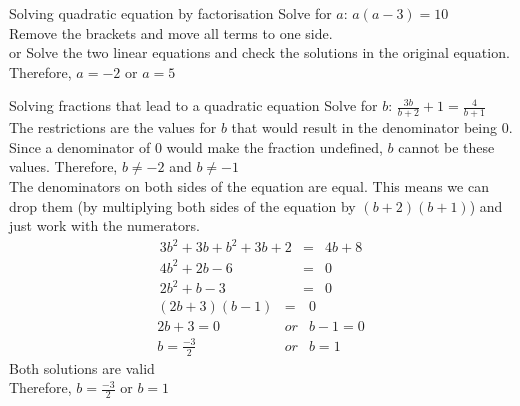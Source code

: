 \begin{wex}{Solving quadratic equation by factorisation}
{Solve for $a$: $a(a-3)=10$\\}{
Remove the brackets and move all terms to one side.\\
or
Solve the two linear equations and check the solutions in the original equation.\\
Therefore, $a = -2$ or $a = 5$
}
\end{wex}

\begin{wex}{Solving fractions that lead to a quadratic equation}
{Solve for $b$: $\frac{3b}{b+2}+ 1 = \frac{4}{b+1}$\\}{
The restrictions are the values for $b$ that would result in the denominator being $0$.  Since a denominator of $0$ would make the fraction undefined, $b$ cannot be these values.
Therefore, $b \neq -2$  and $b \neq -1$\\
The denominators on both sides of the equation are equal.  This means we can drop them (by multiplying both sides of the equation by $(b + 2)(b + 1)$) and just work with the numerators.
\begin{eqnarray*}
3b^2 + 3b + b^2 + 3b + 2 &=& 4b + 8\\
4b^2 + 2b - 6 &=& 0\\
2b^2 + b - 3 &=& 0
\end{eqnarray*}
\begin{eqnarray*}
(2b+3)(b-1) &=& 0\\
2b + 3 = 0 &or& b - 1 = 0\\
b = \frac{-3}{2} &or& b = 1
\end{eqnarray*}
Both solutions are valid\\
Therefore, $b = \frac{-3}{2}$  or  $b = 1$
}
\end{wex}

